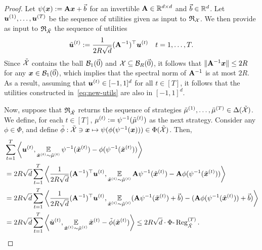 \begin{proof}
    Let $\psi({\bm{x}}) := {\mathbf{A}} {\bm{x}} + \vec{b}$ for an invertible ${\mathbf{A}} \in \mathbb R^{d \times d}$ and $\vec{b} \in \mathbb R^d$. Let ${\bm{u}}^{(1)}, \dots, {\bm{u}}^{(T)}$ be the sequence of utilities given as input to $\mathfrak{R}_{{\mathcal{X}}}$. We then provide as input to $\mathfrak{R}_{\tilde{{\mathcal{X}}}}$ the sequence of utilities
    \begin{equation}
        \label{eq:new-utils}
    \tilde{{\bm{u}}}^{(t)} := \frac{1}{2R \sqrt{d}} ( {\mathbf{A}}^{-1} )^\top {\bm{u}}^{(t)} \quad t = 1, \dots, T.
    \end{equation}
    Since $\tilde{{\mathcal{X}}}$ contains the ball ${\mathcal{B}}_1(\vec{0})$ and ${\mathcal{X}} \subseteq {\mathcal{B}}_R(\vec{0})$, it follows that $\| {\mathbf{A}}^{-1} {\bm{x}} \| \leq 2R$ for any ${\bm{x}} \in {\mathcal{B}}_1(\vec{0})$, which implies that the spectral norm of ${\mathbf{A}}^{-1}$ is at most $2 R$. As a result, assuming that ${\bm{u}}^{(t)} \in [-1, 1]^d$ for all $t \in [T]$, it follows that the utilities constructed in~\eqref{eq:new-utils} are also in $[-1, 1]^d$.
    
    Now, suppose that $\mathfrak{R}_{\tilde{{\mathcal{X}}}}$ returns the sequence of strategies $\tilde{\mu}^{(1)}, \dots, \tilde{\mu}^{(T)} \in \Delta(\tilde{{\mathcal{X}}})$. We define, for each $t \in [T]$, $\mu^{(t)} := \psi^{-1}(\tilde{\mu}^{(t)})$ as the next strategy. Consider any $\phi \in \Phi$, and define $\tilde{\phi} : \tilde{{\mathcal{X}}} \ni {\bm{x}} \mapsto \psi(\phi(\psi^{-1}({\bm{x}}))) \in \Phi(\tilde{{\mathcal{X}}})$. Then,
    \begin{align}
        &\sum_{t=1}^T \left\langle {\bm{u}}^{(t)}, \operatorname*{\mathbb E}_{\tilde{{\bm{x}}}^{(t)} \sim \tilde{\mu}^{(t)}} \psi^{-1}(\tilde{{\bm{x}}}^{(t)}) - \phi(\psi^{-1}(\tilde{{\bm{x}}}^{(t)})) \right\rangle \\
        &= 2R \sqrt{d} \sum_{t=1}^T \left\langle \frac{1}{2R \sqrt{d}} 
({\mathbf{A}}^{-1})^\top {\bm{u}}^{(t)}, \operatorname*{\mathbb E}_{\tilde{{\bm{x}}}^{(t)} \sim \tilde{\mu}^{(t)}} {\mathbf{A}} \psi^{-1}(\tilde{{\bm{x}}}^{(t)}) - {\mathbf{A}} \phi(\psi^{-1}(\tilde{{\bm{x}}}^{(t)})) \right\rangle \\
&= 2R \sqrt{d} \sum_{t=1}^T \left\langle \frac{1}{2R \sqrt{d}} 
({\mathbf{A}}^{-1})^\top {\bm{u}}^{(t)}, \operatorname*{\mathbb E}_{\tilde{{\bm{x}}}^{(t)} \sim \tilde{\mu}^{(t)}} ({\mathbf{A}} \psi^{-1}(\tilde{{\bm{x}}}^{(t)}) + \vec{b}) - ({\mathbf{A}} \phi(\psi^{-1}(\tilde{{\bm{x}}}^{(t)})) + \vec{b}) \right\rangle \\
&= 2R \sqrt{d} \sum_{t=1}^T \left\langle \tilde{{\bm{u}}}^{(t)}, \operatorname*{\mathbb E}_{\tilde{{\bm{x}}}^{(t)} \sim \tilde{\mu}^{(t)}} \tilde{{\bm{x}}}^{(t)}  - \tilde{\phi}(\tilde{{\bm{x}}}^{(t)}) \right\rangle \leq 2R \sqrt{d} \cdot \Phi\text{-}\operatorname{Reg}^{(T)}_{\tilde{{\mathcal{X}}}}.
    \end{align}
\end{proof}
